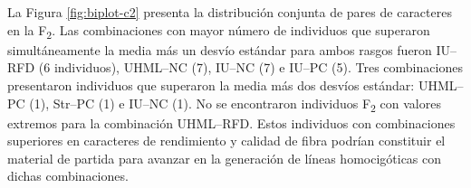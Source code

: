 \documentclass[12pt,oneside]{reedthesis}
\begin{document}
\begin{table}[!h]
\centering
\caption{\label{tab:tabla-trans-c2}Número esperado y observado de fenotipos extremos para detección de segregación transgresiva en la población F\textsubscript{2}}
\centering
{}
\end{table}

La Figura \ref{fig:biplot-c2} presenta la distribución conjunta de pares de caracteres en la F\textsubscript{2}. Las combinaciones con mayor número de individuos que superaron simultáneamente la media más un desvío estándar para ambos rasgos fueron IU--RFD (6 individuos), UHML--NC (7), IU--NC (7) e IU--PC (5). Tres combinaciones presentaron individuos que superaron la media más dos desvíos estándar: UHML--PC (1), Str--PC (1) e IU--NC (1). No se encontraron individuos F\textsubscript{2} con valores extremos para la combinación UHML--RFD. Estos individuos con combinaciones superiores en caracteres de rendimiento y calidad de fibra podrían constituir el material de partida para avanzar en la generación de líneas homocigóticas con dichas combinaciones.
\end{document}
